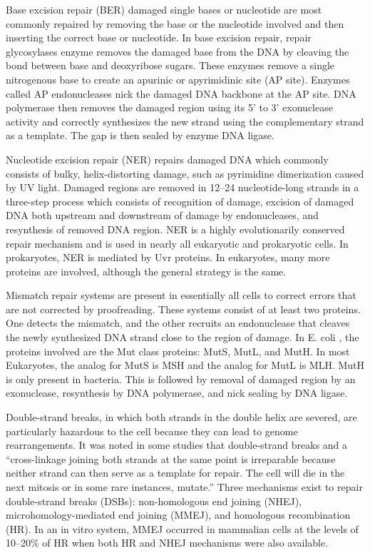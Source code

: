 Base excision repair (BER) damaged single bases or nucleotide are most commonly repaired by removing the base or the nucleotide involved and then inserting the correct base or nucleotide. In base excision repair, repair glycosylases enzyme removes the damaged base from the DNA by cleaving the bond between base and deoxyribose sugars. These enzymes remove a single nitrogenous base to create an apurinic or apyrimidinic site (AP site). Enzymes called AP endonucleases nick the damaged DNA backbone at the AP site. DNA polymerase then removes the damaged region using its 5' to 3' exonuclease activity and correctly synthesizes the new strand using the complementary strand as a template. The gap is then sealed by enzyme DNA ligase.

Nucleotide excision repair (NER) repairs damaged DNA which commonly consists of bulky, helix-distorting damage, such as pyrimidine dimerization caused by UV light. Damaged regions are removed in 12--24 nucleotide-long strands in a three-step process which consists of recognition of damage, excision of damaged DNA both upstream and downstream of damage by endonucleases, and resynthesis of removed DNA region. NER is a highly evolutionarily conserved repair mechanism and is used in nearly all eukaryotic and prokaryotic cells. In prokaryotes, NER is mediated by Uvr proteins. In eukaryotes, many more proteins are involved, although the general strategy is the same.

Mismatch repair systems are present in essentially all cells to correct errors that are not corrected by proofreading. These systems consist of at least two proteins. One detects the mismatch, and the other recruits an endonuclease that cleaves the newly synthesized DNA strand close to the region of damage. In E. coli , the proteins involved are the Mut class proteins: MutS, MutL, and MutH. In most Eukaryotes, the analog for MutS is MSH and the analog for MutL is MLH. MutH is only present in bacteria. This is followed by removal of damaged region by an exonuclease, resynthesis by DNA polymerase, and nick sealing by DNA ligase.

Double-strand breaks, in which both strands in the double helix are severed, are particularly hazardous to the cell because they can lead to genome rearrangements. It was noted in some studies that double-strand breaks and a ``cross-linkage joining both strands at the same point is irreparable because neither strand can then serve as a template for repair. The cell will die in the next mitosis or in some rare instances, mutate.'' Three mechanisms exist to repair double-strand breaks (DSBs): non-homologous end joining (NHEJ), microhomology-mediated end joining (MMEJ), and homologous recombination (HR). In an in vitro system, MMEJ occurred in mammalian cells at the levels of 10--20\% of HR when both HR and NHEJ mechanisms were also available.

